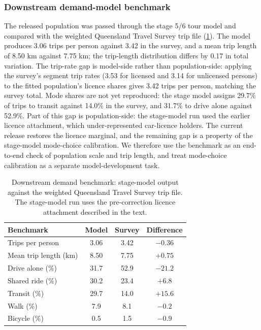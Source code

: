 \documentclass[review]{elsarticle}
\begin{document}
\subsubsection{Downstream demand-model benchmark}
\label{sec:abm_validation}
The released population was passed through the stage 5/6 tour model and
compared with the weighted Queensland Travel Survey trip file
(\cref{tab:abm_validation}). The model produces 3.06 trips per person against
3.42 in the survey, and a mean trip length of 8.50 km against 7.75 km; the
trip-length distribution differs by 0.17 in total variation. The trip-rate
gap is model-side rather than population-side: applying the survey's segment
trip rates (3.53 for licensed and 3.14 for unlicensed persons) to the fitted
population's licence shares gives 3.42 trips per person, matching the survey
total. Mode shares are not yet reproduced: the stage model assigns 29.7\% of
trips to transit against 14.0\% in the survey, and 31.7\% to drive alone
against 52.9\%. Part of this gap is population-side: the stage-model run used
the earlier licence attachment, which under-represented car-licence holders.
The current release restores the licence marginal, and the remaining gap is a
property of the stage-model mode-choice calibration. We therefore use the
benchmark as an end-to-end check of population scale and trip length, and
treat mode-choice calibration as a separate model-development task.

\begin{table}[H]
\centering
\caption{Downstream demand benchmark: stage-model output against the weighted
Queensland Travel Survey trip file. The stage-model run uses the
pre-correction licence attachment described in the text.}
\label{tab:abm_validation}
\begin{tabular}{lccc}
\toprule
Benchmark & Model & Survey & Difference \\
\midrule
Trips per person            & 3.06  & 3.42  & $-0.36$ \\
Mean trip length (km)       & 8.50  & 7.75  & $+0.75$ \\
Drive alone (\%)            & 31.7  & 52.9  & $-21.2$ \\
Shared ride (\%)            & 30.2  & 23.4  & $+6.8$ \\
Transit (\%)                & 29.7  & 14.0  & $+15.6$ \\
Walk (\%)                   &  7.9  &  8.1  & $-0.2$ \\
Bicycle (\%)                &  0.5  &  1.5  & $-0.9$ \\
\bottomrule
\end{tabular}
\end{table}
\end{document}
